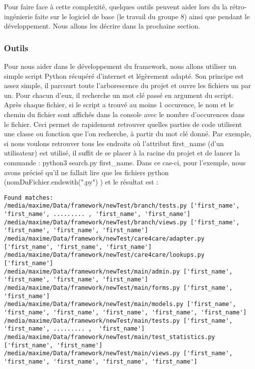 Pour faire face à cette complexité,  quelques outils peuvent aider lors du la rétro-ingénierie faite sur le logiciel de base (le travail du groupe 8) ainsi que pendant le développement.  Nous allons les décrire dans la prochaine section.

\subsubsection{Outils}

Pour nous aider dans le développement du framework,  nous allons utiliser un simple script Python récupéré d'internet et légèrement adapté.  Son principe est assez simple,  il parcourt toute l'arborescence du projet et ouvre les fichiers un par un.  Pour chacun d'eux,  il recherche un mot clé passé en argument du script.  Après chaque fichier,  si le script a trouvé au moins 1 occurence,  le nom et le chemin du fichier sont affichés dans la console avec le nombre d'occurences dans le fichier.  Ceci permet de rapidement retrouver quelles parties de code utilisent une classe ou fonction que l'on recherche,  à partir du mot clé donné.  Par exemple,  si nous voulons retrouver tous les endroits où l'attribut first\_name (d'un utilisateur) est utilisé,  il suffit de se placer à la racine du projet et de lancer la commande : python3 search.py first\_name.  Dans ce cas-ci,  pour l'exemple,  nous avons précisé qu'il ne fallait lire que les fichiers python (nomDuFichier.endswith(".py") ) et le résultat est : 

\begin{lstlisting}
Found matches:
/media/maxime/Data/framework/newTest/branch/tests.py ['first_name', 'first_name', ......... , 'first_name', 'first_name']
/media/maxime/Data/framework/newTest/branch/views.py ['first_name', 'first_name', 'first_name', 'first_name']
/media/maxime/Data/framework/newTest/care4care/adapter.py ['first_name', 'first_name', 'first_name']
/media/maxime/Data/framework/newTest/care4care/lookups.py ['first_name']
/media/maxime/Data/framework/newTest/main/admin.py ['first_name', 'first_name', 'first_name', 'first_name']
/media/maxime/Data/framework/newTest/main/forms.py ['first_name', 'first_name']
/media/maxime/Data/framework/newTest/main/models.py ['first_name', 'first_name', 'first_name', 'first_name', 'first_name', 'first_name']
/media/maxime/Data/framework/newTest/main/tests.py ['first_name', 'first_name', ......... ,  'first_name']
/media/maxime/Data/framework/newTest/main/test_statistics.py ['first_name', 'first_name']
/media/maxime/Data/framework/newTest/main/views.py ['first_name', 'first_name', 'first_name', 'first_name', 'first_name']
\end{lstlisting}

